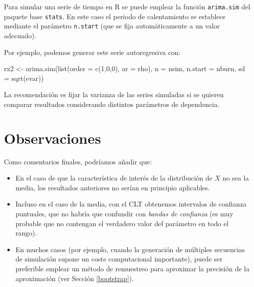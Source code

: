 \documentclass[
]{book}
\newenvironment{Shaded}{\begin{snugshade}}{\end{snugshade}}
\newcommand{\AttributeTok}[1]{\textcolor[rgb]{0.77,0.63,0.00}{#1}}
\newcommand{\DecValTok}[1]{\textcolor[rgb]{0.00,0.00,0.81}{#1}}
\newcommand{\FunctionTok}[1]{\textcolor[rgb]{0.00,0.00,0.00}{#1}}
\newcommand{\NormalTok}[1]{#1}
\newcommand{\OtherTok}[1]{\textcolor[rgb]{0.56,0.35,0.01}{#1}}
\theoremstyle{break}
\theoremstyle{nonumberplain}
\begin{document}
Para simular una serie de tiempo en R se puede emplear la función \texttt{arima.sim} del paquete base \texttt{stats}.
En este caso el periodo de calentamiento se establece mediante el parámetro \texttt{n.start} (que se fija automáticamente a un valor adecuado).

Por ejemplo, podemos generar este serie autoregresiva con:

\begin{Shaded}
\begin{Highlighting}[]
\NormalTok{rx2 }\OtherTok{\textless{}{-}} \FunctionTok{arima.sim}\NormalTok{(}\FunctionTok{list}\NormalTok{(}\AttributeTok{order =} \FunctionTok{c}\NormalTok{(}\DecValTok{1}\NormalTok{,}\DecValTok{0}\NormalTok{,}\DecValTok{0}\NormalTok{), }\AttributeTok{ar =}\NormalTok{ rho), }\AttributeTok{n =}\NormalTok{ nsim, }
                 \AttributeTok{n.start =}\NormalTok{ nburn, }\AttributeTok{sd =} \FunctionTok{sqrt}\NormalTok{(evar))}
\end{Highlighting}
\end{Shaded}

La recomendación es fijar la varianza de las series simuladas si se quieren comparar
resultados considerando distintos parámetros de dependencia.

\hypertarget{observaciones}{%
\section{Observaciones}\label{observaciones}}

Como comentarios finales, podríamos añadir que:

\begin{itemize}
\item
  En el caso de que la característica de interés de la distribución de \(X\) no sea la media, los resultados anteriores no serían en principio aplicables.
\item
  Incluso en el caso de la media, con el CLT obtenemos intervalos de confianza puntuales, que no habría que confundir con \emph{bandas de confianza} (es muy probable que no contengan el verdadero valor del parámetro en todo el rango).
\item
  En muchos casos (por ejemplo, cuando la generación de múltiples secuencias de simulación supone un coste computacional importante), puede ser preferible emplear un método de remuestreo para aproximar la precisión de la aproximación (ver Sección \ref{bootstrap}).
\end{itemize}
\end{document}
